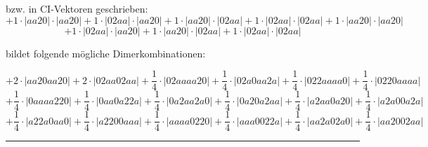 \documentclass{article}
\begin{document}
\begin{minipage}{\linewidth}
bzw. in CI-Vektoren geschrieben: 
 $$+ 1 \cdot \left|aa20 \right| \cdot \left| aa20 \right| 
+ 1 \cdot \left|02aa \right| \cdot \left| aa20 \right| 
+ 1 \cdot \left|aa20 \right| \cdot \left| 02aa \right| 
+ 1 \cdot \left|02aa \right| \cdot \left| 02aa \right| 
+ 1 \cdot \left|aa20 \right| \cdot \left| aa20 \right| 
 $$ $$ + 1 \cdot \left|02aa \right| \cdot \left| aa20 \right| 
+ 1 \cdot \left|aa20 \right| \cdot \left| 02aa \right| 
+ 1 \cdot \left|02aa \right| \cdot \left| 02aa \right| 
$$



 bildet folgende mögliche Dimerkombinationen:

$$+ 2 \cdot \left|aa20aa20 \right| + 2 \cdot \left|02aa02aa \right| + \frac{1}{4} \cdot \left|02aaaa20 \right| + \frac{1}{4} \cdot \left|02a0aa2a \right| + \frac{1}{4} \cdot \left|022aaaa0 \right| + \frac{1}{4} \cdot \left|0220aaaa \right|  $$ $$ + \frac{1}{4} \cdot \left|0aaaa220 \right| + \frac{1}{4} \cdot \left|0aa0a22a \right| + \frac{1}{4} \cdot \left|0a2aa2a0 \right| + \frac{1}{4} \cdot \left|0a20a2aa \right| + \frac{1}{4} \cdot \left|a2aa0a20 \right| + \frac{1}{4} \cdot \left|a2a00a2a \right|  $$ $$ + \frac{1}{4} \cdot \left|a22a0aa0 \right| + \frac{1}{4} \cdot \left|a2200aaa \right| + \frac{1}{4} \cdot \left|aaaa0220 \right| + \frac{1}{4} \cdot \left|aaa0022a \right| + \frac{1}{4} \cdot \left|aa2a02a0 \right| + \frac{1}{4} \cdot \left|aa2002aa \right| $$



\end{minipage}
\vspace{0.5cm}
\hrule
\vspace{0.5cm}
\end{document}
